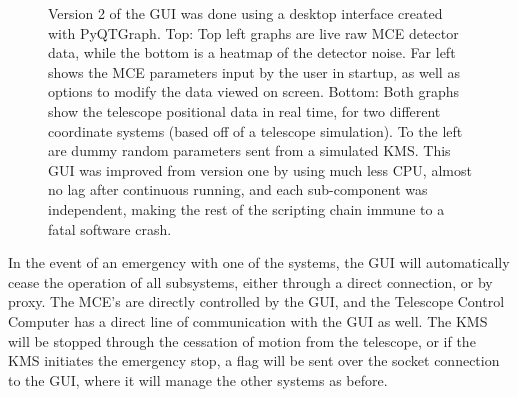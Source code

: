 \documentclass[manuscript]{aastex}
\begin{document}
\begin{figure}[H]%
    \centering
    \qquad
    \singlespace
    \caption[GUI Beta Version 2.0]{Version 2 of the GUI was done using a desktop interface created with {\sc PyQTGraph}. Top: Top left graphs are live raw MCE detector data, while the bottom is a heatmap of the detector noise. Far left shows the MCE parameters input by the user in startup, as well as options to modify the data viewed on screen. Bottom: Both graphs show the telescope positional data in real time, for two different coordinate systems (based off of a telescope simulation). To the left are dummy random parameters sent from a simulated KMS. This GUI was improved from version one by using much less CPU, almost no lag after continuous running, and each sub-component was independent, making the rest of the scripting chain immune to a fatal software crash.}%
    \label{fig:gui2}%
\end{figure}

In the event of an emergency with one of the systems, the GUI will automatically cease the operation of all subsystems, either through a direct connection, or by proxy. The MCE's are directly controlled by the GUI, and the Telescope Control Computer has a direct line of communication with the GUI as well. The KMS will be stopped through the cessation of motion from the telescope, or if the KMS initiates the emergency stop, a flag will be sent over the socket connection to the GUI, where it will manage the other systems as before. 
\end{document}
